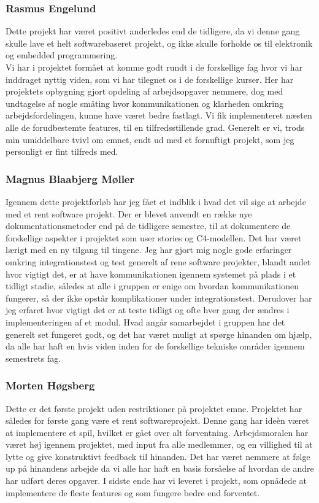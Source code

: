 \subsubsection{Rasmus Engelund}
Dette projekt har været positivt anderledes end de tidligere, da vi denne gang skulle lave et helt softwarebaseret projekt, og ikke skulle forholde os til elektronik og embedded programmering.\\
Vi har i projektet formået at komme godt rundt i de forskellige fag hvor vi har inddraget nyttig viden, som vi har tilegnet os i de forskellige kurser. Her har projektets opbygning gjort opdeling af arbejdsopgaver nemmere, dog med undtagelse af nogle småting hvor kommunikationen og klarheden omkring arbejdsfordelingen, kunne have været bedre fastlagt.
Vi fik implementeret næsten alle de forudbestemte features, til en tilfredsstillende grad.
Generelt er vi, trods min umiddelbare tvivl om emnet, endt ud med et fornuftigt projekt, som jeg personligt er fint tilfreds med. 

\subsubsection{Magnus Blaabjerg Møller}
Igennem dette projektforløb har jeg fået et indblik i hvad det vil sige at arbejde med et rent software projekt. Der er blevet anvendt en række nye dokumentationsmetoder end på de tidligere semestre, til at dokumentere de forskellige aspekter i projektet som user stories og C4-modellen. Det har været lærigt med en ny tilgang til tingene. Jeg har gjort mig nogle gode erfaringer omkring integrationstest og test generelt af rene software projekter, blandt andet hvor vigtigt det, er at have kommunikationen igennem systemet på plads i et tidligt stadie, således at alle i gruppen er enige om hvordan kommunikationen fungerer, så der ikke opstår komplikationer under integrationstest. Derudover har jeg erfaret hvor vigtigt det er at teste tidligt og ofte hver gang der ændres i implementeringen af et modul. Hvad angår samarbejdet i gruppen har det generelt set fungeret godt, og det har været muligt at spørge hinanden om hjælp, da alle har haft en hvis viden inden for de forskellige tekniske områder igennem semestrets fag.\\

\subsubsection{Morten Høgsberg}
Dette er det første projekt uden restriktioner på projektet emne. Projektet har således for første gang
være et rent softwareprojekt. Denne gang har ideèn været at implementere et spil, hvilket er gået over
alt forventning. Arbejdsmoralen har været høj igennem projektet, med input fra alle medlemmer, og en
villighed til at lytte og give konstruktivt feedback til hinanden.
Det har været nemmere at følge up på hinandens arbejde da vi alle har haft en basis forsåelse af hvordan 
de andre har udført deres opgaver. I sidste ende har vi leveret i projekt, som opnådede at implementere
de fleste features og som fungere bedre end forventet. 

